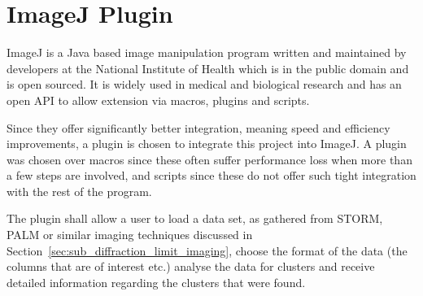 
\part{ImageJ Plugin}
\label{prt:imagej_plugin}

ImageJ is a Java based image manipulation program written and maintained by
developers at the National Institute of Health which is in the public domain
and is open sourced. It is widely used in medical and biological research and
has an open API to allow extension via macros, plugins and scripts.

Since they offer significantly better integration, meaning speed and efficiency
improvements, a plugin is chosen to integrate this project into ImageJ. A
plugin was chosen over macros since these often suffer performance loss when
more than a few steps are involved, and scripts since these do not offer such
tight integration with the rest of the program.

The plugin shall allow a user to load a data set, as gathered from STORM, PALM
or similar imaging techniques discussed in
Section~\ref{sec:sub_diffraction_limit_imaging}, choose the format of the data
(the columns that are of interest etc.) analyse the data for clusters and
receive detailed information regarding the clusters that were found.
